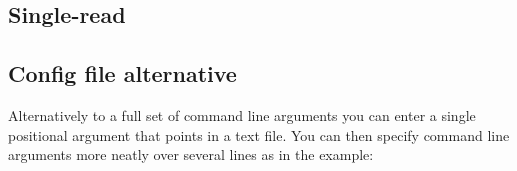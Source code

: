 \documentclass[letterpaper,10pt,english]{sphinxmanual}
\begin{document}
\subsection{Single-read}
\label{\detokenize{intro:single-read}}\begin{quote}

\begin{sphinxVerbatim}[commandchars=\\\{\}]
              
\end{sphinxVerbatim}
\end{quote}


\subsection{Config file alternative}
\label{\detokenize{intro:config-file-alternative}}
Alternatively to a full set of command line arguments you can enter a single positional argument that points in a text file.  You can then specify command line arguments more neatly over several lines as in the example:
\begin{quote}

\begin{sphinxVerbatim}[commandchars=\\\{\}]
 
 
\end{sphinxVerbatim}
\end{quote}
\end{document}
